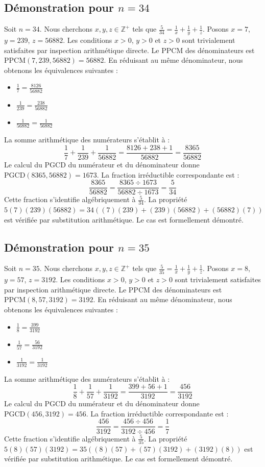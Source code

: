 \documentclass[12pt,a4paper]{article}
\begin{document}
\subsection{Démonstration pour $n = 34$}
Soit $n = 34$. Nous cherchons $x, y, z \in \mathbb{Z}^{+}$ tels que $\frac{5}{34} = \frac{1}{x} + \frac{1}{y} + \frac{1}{z}$.
Posons $x = 7$, $y = 239$, $z = 56882$.
Les conditions $x > 0$, $y > 0$ et $z > 0$ sont trivialement satisfaites par inspection arithmétique directe.
Le PPCM des dénominateurs est $\text{PPCM}(7, 239, 56882) = 56882$.
En réduisant au même dénominateur, nous obtenons les équivalences suivantes :
\begin{itemize}
    \item $\frac{1}{7} = \frac{8126}{56882}$
    \item $\frac{1}{239} = \frac{238}{56882}$
    \item $\frac{1}{56882} = \frac{1}{56882}$
\end{itemize}
La somme arithmétique des numérateurs s'établit à :
$$ \frac{1}{7} + \frac{1}{239} + \frac{1}{56882} = \frac{8126 + 238 + 1}{56882} = \frac{8365}{56882} $$
Le calcul du PGCD du numérateur et du dénominateur donne $\text{PGCD}(8365, 56882) = 1673$.
La fraction irréductible correspondante est :
$$ \frac{8365}{56882} = \frac{8365 \div 1673}{56882 \div 1673} = \frac{5}{34} $$
Cette fraction s'identifie algébriquement à $\frac{5}{34}$.
La propriété $5(7)(239)(56882) = 34((7)(239) + (239)(56882) + (56882)(7))$ est vérifiée par substitution arithmétique.
Le cas est formellement démontré.

\subsection{Démonstration pour $n = 35$}
Soit $n = 35$. Nous cherchons $x, y, z \in \mathbb{Z}^{+}$ tels que $\frac{5}{35} = \frac{1}{x} + \frac{1}{y} + \frac{1}{z}$.
Posons $x = 8$, $y = 57$, $z = 3192$.
Les conditions $x > 0$, $y > 0$ et $z > 0$ sont trivialement satisfaites par inspection arithmétique directe.
Le PPCM des dénominateurs est $\text{PPCM}(8, 57, 3192) = 3192$.
En réduisant au même dénominateur, nous obtenons les équivalences suivantes :
\begin{itemize}
    \item $\frac{1}{8} = \frac{399}{3192}$
    \item $\frac{1}{57} = \frac{56}{3192}$
    \item $\frac{1}{3192} = \frac{1}{3192}$
\end{itemize}
La somme arithmétique des numérateurs s'établit à :
$$ \frac{1}{8} + \frac{1}{57} + \frac{1}{3192} = \frac{399 + 56 + 1}{3192} = \frac{456}{3192} $$
Le calcul du PGCD du numérateur et du dénominateur donne $\text{PGCD}(456, 3192) = 456$.
La fraction irréductible correspondante est :
$$ \frac{456}{3192} = \frac{456 \div 456}{3192 \div 456} = \frac{1}{7} $$
Cette fraction s'identifie algébriquement à $\frac{5}{35}$.
La propriété $5(8)(57)(3192) = 35((8)(57) + (57)(3192) + (3192)(8))$ est vérifiée par substitution arithmétique.
Le cas est formellement démontré.
\end{document}
